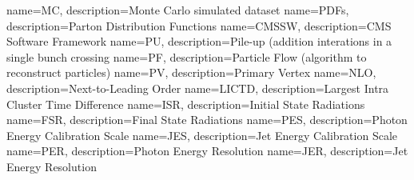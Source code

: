    {name=MC,   description={Monte Carlo simulated dataset}}
   {name=PDFs,   description={Parton Distribution Functions}}
   {name=CMSSW,   description={CMS Software Framework}}
   {name=PU,   description={Pile-up (addition interations in a single bunch crossing}}
   {name=PF,   description={Particle Flow (algorithm to reconstruct particles)}}
   {name=PV,   description={Primary Vertex}}
   {name=NLO,   description={Next-to-Leading Order}}
 {name=LICTD,   description={Largest Intra Cluster Time Difference}}
   {name=ISR,   description={Initial State Radiations}}
   {name=FSR,   description={Final State Radiations}}
   {name=PES,   description={Photon Energy Calibration Scale}}
   {name=JES,   description={Jet Energy Calibration Scale}}
   {name=PER,   description={Photon Energy Resolution}}
   {name=JER,   description={Jet Energy Resolution}}
